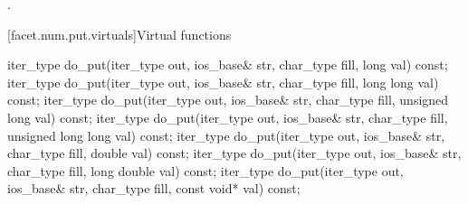 \begin{itemdescr}
\pnum
\returns
{}.
\end{itemdescr}

[facet.num.put.virtuals]{Virtual functions}

%
\begin{itemdecl}
iter_type do_put(iter_type out, ios_base& str, char_type fill, long val) const;
iter_type do_put(iter_type out, ios_base& str, char_type fill, long long val) const;
iter_type do_put(iter_type out, ios_base& str, char_type fill, unsigned long val) const;
iter_type do_put(iter_type out, ios_base& str, char_type fill, unsigned long long val) const;
iter_type do_put(iter_type out, ios_base& str, char_type fill, double val) const;
iter_type do_put(iter_type out, ios_base& str, char_type fill, long double val) const;
iter_type do_put(iter_type out, ios_base& str, char_type fill, const void* val) const;
\end{itemdecl}


